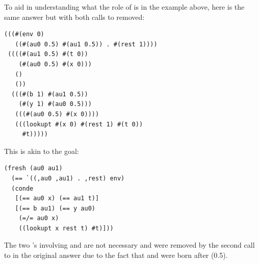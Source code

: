 To aid in understanding what the role of  is in the example above, here is the same answer but with both calls to  removed:
\begin{lstlisting}
(((#(env 0)
   ((#(au0 0.5) #(au1 0.5)) . #(rest 1))))
 ((((#(au1 0.5) #(t 0))
    (#(au0 0.5) #(x 0)))
   ()
   ())
  (((#(b 1) #(au1 0.5))
    (#(y 1) #(au0 0.5)))
   (((#(au0 0.5) #(x 0))))
   (((lookupt #(x 0) #(rest 1) #(t 0))
     #t)))))
\end{lstlisting}
This is akin to the goal:
\begin{lstlisting}
(fresh (au0 au1)
  (== `((,au0 ,au1) . ,rest) env)
  (conde
   [(== au0 x) (== au1 t)]
   [(== b au1) (== y au0)
    (=/= au0 x)
    ((lookupt x rest t) #t)]))
\end{lstlisting}
The two \code{==}'s involving  and  are not necessary and were removed by the second call to  in the original answer due to the fact that  and  were born after  (0.5).